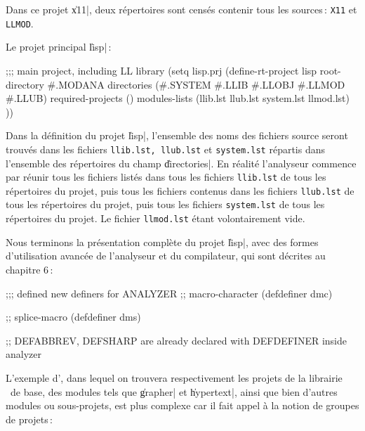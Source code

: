 Dans ce projet \|x11|, deux r\'{e}pertoires sont cens\'{e}s contenir tous
les sources\,: {\tt X11} et {\tt LLMOD}.

Le projet principal \|lisp|\,:


\begin{Longcode*}
;;; main project, including LL library
(setq lisp.prj
(define-rt-project lisp
  root-directory \#.MODANA
  directories (\#.SYSTEM
               \#.LLIB
               \#.LLOBJ
               \#.LLMOD
               \#.LLUB)
  required-projects ()
  modules-lists (llib.lst llub.lst system.lst llmod.lst)
))
\end{Longcode*}

Dans la d\'{e}finition du projet \|lisp|, l'ensemble des noms des
fichiers source seront trouv\'{e}s dans les fichiers {\tt llib.lst,
llub.lst} et {\tt system.lst} r\'{e}partis dans l'ensemble des
r\'{e}pertoires du champ \|directories|. En r\'{e}alit\'{e} l'analyseur
commence par r\'{e}unir tous les fichiers list\'{e}s dans tous les fichiers
{\tt llib.lst} de tous les r\'{e}pertoires du projet, puis tous les
fichiers contenus dans les fichiers {\tt llub.lst} de tous les
r\'{e}pertoires du projet, puis tous les fichiers {\tt system.lst} de
tous les r\'{e}pertoires du projet. Le fichier {\tt llmod.lst} \'{e}tant
volontairement vide.

Nous terminons la pr\'{e}sentation compl\`{e}te du projet \|lisp|,
avec des formes d'utilisation avanc\'{e}e de l'analyseur et du compilateur,
qui sont d\'{e}crites au chapitre 6\,:

\begin{Longcode*}
;;; defined new definers for ANALYZER
;; macro-character
(defdefiner dmc)

;; splice-macro
(defdefiner dms)

;; DEFABBREV, DEFSHARP are already declared with DEFDEFINER inside analyzer 
\end{Longcode*}


L'exemple d'\Aida, dans lequel on trouvera respectivement les projets 
de la librairie \Aida\ de base, des modules tels que
\|grapher| et \|hypertext|, ainsi que bien
d'autres modules ou sous-projets, est plus complexe car il fait appel
\`{a} la notion de groupes de projets\,:

